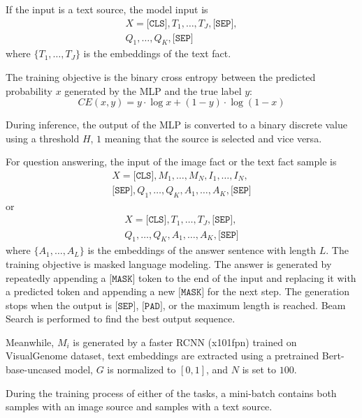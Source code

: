 \documentclass[nohyperref]{article}
\theoremstyle{plain}
\theoremstyle{definition}
\theoremstyle{remark}
\begin{document}
If the input is a text source, the model input is
\begin{gather*}
    X = \texttt{[CLS]}, T_1, \dots, T_J, \texttt{[SEP]}, \\
    Q_1, \dots, Q_K, \texttt{[SEP]}
\end{gather*}
where $\{T_1, \dots, T_J\}$ is the embeddings of the text fact.

The training objective is the binary cross entropy between the predicted probability $x$ generated by the MLP and the true label $y$:
\begin{equation}
CE(x, y) = y \cdot \log x + (1 - y) \cdot \log (1 - x)
\end{equation}

During inference, the output of the MLP is converted to a binary discrete value using a threshold $H$, $1$ meaning that the source is selected and vice versa.

For question answering, the input of the image fact or the text fact sample is
\begin{gather*}
    X = \texttt{[CLS]}, M_1, \dots, M_N, I_1, \dots, I_N, \\
    \texttt{[SEP]}, Q_1, \dots, Q_K, A_1, \dots, A_K, \texttt{[SEP]}
\end{gather*}
or
\begin{gather*}
    X = \texttt{[CLS]}, T_1, \dots, T_J, \texttt{[SEP]}, \\
    Q_1, \dots, Q_K, A_1, \dots, A_K, \texttt{[SEP]}
\end{gather*}
where $\{A_1, \dots, A_L\}$ is the embeddings of the answer sentence with length $L$.
The training objective is masked language modeling.
The answer is generated by repeatedly appending a $\texttt{[MASK]}$ token to the end of the input and replacing it with a predicted token and appending a new $\texttt{[MASK]}$ for the next
step. The generation stops when the output is $\texttt{[SEP]}$, $\texttt{[PAD]}$, or the maximum length is reached.
Beam Search is performed to find the best output sequence.

Meanwhile, $M_i$ is generated by a faster RCNN (x101fpn) \cite{rcnn} trained on VisualGenome \cite{visualgenome} dataset, text embeddings are extracted using a pretrained Bert-base-uncased model, $G$ is normalized to $[0, 1]$, and $N$ is set to $100$.

During the training process of either of the tasks, a mini-batch contains both samples with an image source and samples with a text source.
\end{document}

